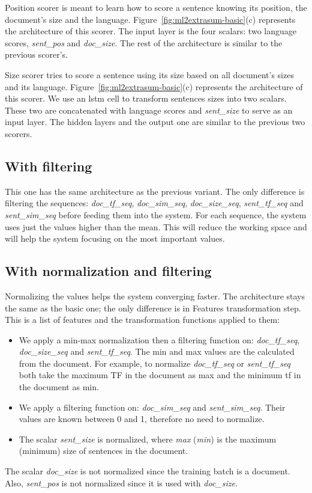 Position scorer is meant to learn how to score a sentence knowing its position, the document's size and the language. 
Figure~\ref{fig:ml2extrasum-basic}(c) represents the architecture of this scorer. 
The input layer is the four scalars: two language scores, \textit{sent\_pos} and \textit{doc\_size}. 
The rest of the architecture is similar to the previous scorer's. 

Size scorer tries to score a sentence using its size based on all document's sizes and its language.
Figure~\ref{fig:ml2extrasum-basic}(c) represents the architecture of this scorer.
We use an \ac{lstm} cell to transform sentences sizes into two scalars. 
These two are concatenated with language scores and \textit{sent\_size} to serve as an input layer. 
The hidden layers and the output one are similar to the previous two scorers. 

\subsection{With filtering}

This one has the same architecture as the previous variant. 
The only difference is filtering the sequences: \textit{doc\_tf\_seq}, \textit{doc\_sim\_seq}, \textit{doc\_size\_seq}, \textit{sent\_tf\_seq} and \textit{sent\_sim\_seq} before feeding them into the system. 
For each sequence, the system uses just the values higher than the mean. 
This will reduce the working space and will help the system focusing on the most important values.

\subsection{With normalization and filtering}

Normalizing the values helps the system converging faster. 
The architecture stays the same as the basic one; the only difference is in Features transformation step. 
This is a list of features and the transformation functions applied to them:
\begin{itemize}
	\item We apply a min-max normalization then a filtering function on: \textit{doc\_tf\_seq}, \textit{doc\_size\_seq} and \textit{sent\_tf\_seq}. 
	The min and max values are the calculated from the document. 
	For example, to normalize \textit{doc\_tf\_seq} or \textit{sent\_tf\_seq} both take the maximum TF in the document as max and the minimum tf in the document as min.
	\item We apply a filtering function on: \textit{doc\_sim\_seq} and \textit{sent\_sim\_seq}. 
	Their values are known between 0 and 1, therefore no need to normalize.
	\item The scalar \textit{sent\_size} is normalized, where \textit{max} (\textit{min}) is the maximum (minimum) size of sentences in the document.
\end{itemize}
The scalar \textit{doc\_size} is not normalized since the training batch is a document. 
Also, \textit{sent\_pos} is not normalized since it is used with \textit{doc\_size}. 


